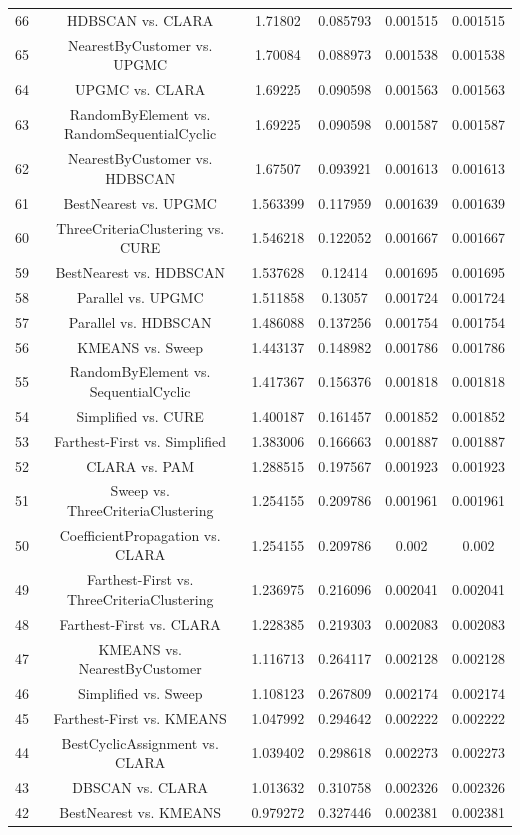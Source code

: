 \documentclass[a4paper,10pt]{article}
\begin{document}
\begin{landscape}
\begin{table}[!htp]
\begin{tabular}{cccccc}
66&HDBSCAN vs. CLARA&1.71802&0.085793&0.001515&0.001515\\
65&NearestByCustomer vs. UPGMC&1.70084&0.088973&0.001538&0.001538\\
64&UPGMC vs. CLARA&1.69225&0.090598&0.001563&0.001563\\
63&RandomByElement vs. RandomSequentialCyclic&1.69225&0.090598&0.001587&0.001587\\
62&NearestByCustomer vs. HDBSCAN&1.67507&0.093921&0.001613&0.001613\\
61&BestNearest vs. UPGMC&1.563399&0.117959&0.001639&0.001639\\
60&ThreeCriteriaClustering vs. CURE&1.546218&0.122052&0.001667&0.001667\\
59&BestNearest vs. HDBSCAN&1.537628&0.12414&0.001695&0.001695\\
58&Parallel vs. UPGMC&1.511858&0.13057&0.001724&0.001724\\
57&Parallel vs. HDBSCAN&1.486088&0.137256&0.001754&0.001754\\
56&KMEANS vs. Sweep&1.443137&0.148982&0.001786&0.001786\\
55&RandomByElement vs. SequentialCyclic&1.417367&0.156376&0.001818&0.001818\\
54&Simplified vs. CURE&1.400187&0.161457&0.001852&0.001852\\
53&Farthest-First vs. Simplified&1.383006&0.166663&0.001887&0.001887\\
52&CLARA vs. PAM&1.288515&0.197567&0.001923&0.001923\\
51&Sweep vs. ThreeCriteriaClustering&1.254155&0.209786&0.001961&0.001961\\
50&CoefficientPropagation vs. CLARA&1.254155&0.209786&0.002&0.002\\
49&Farthest-First vs. ThreeCriteriaClustering&1.236975&0.216096&0.002041&0.002041\\
48&Farthest-First vs. CLARA&1.228385&0.219303&0.002083&0.002083\\
47&KMEANS vs. NearestByCustomer&1.116713&0.264117&0.002128&0.002128\\
46&Simplified vs. Sweep&1.108123&0.267809&0.002174&0.002174\\
45&Farthest-First vs. KMEANS&1.047992&0.294642&0.002222&0.002222\\
44&BestCyclicAssignment vs. CLARA&1.039402&0.298618&0.002273&0.002273\\
43&DBSCAN vs. CLARA&1.013632&0.310758&0.002326&0.002326\\
42&BestNearest vs. KMEANS&0.979272&0.327446&0.002381&0.002381\\

\end{tabular}
\end{table}
\end{landscape}
\end{document}
